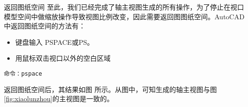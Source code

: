 \begin{procedure}
\begin{figure}[htbp]
\centering
\begin{floatrow}[2]
\end{floatrow}
\end{figure}
\begin{figure}[htbp]
\centering
\begin{floatrow}[2]
\end{floatrow}
\end{figure}


\item 返回图纸空间
至此，我们已经完成了轴主视图生成的所有操作，为了停止在视口模型空间中做缩放操作导致视图比例改变，因此需要返回图图纸空间。AutoCAD中返回图纸空间的方法有：
\begin{itemize}
\item 键盘输入 PSPACE或PS。
\item 用鼠标双击视口以外的空白区域
\end{itemize}
\begin{lstlisting}
命令：pspace
\end{lstlisting}
返回图纸空间后，其结果如图 所示。从图中，可知生成的轴主视图与图\ref{fig:xiaolunzhou}的主视图是一致的。

\end{procedure}

\endinput